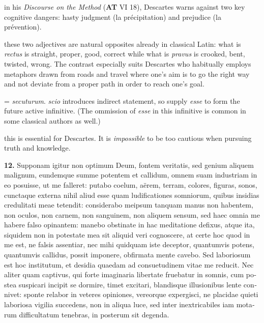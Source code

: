  in his \textit{Discourse on the Method} (\textbf{AT} VI 18), Descartes warns against two key cognitive dangers: hasty judgment (la précipitation) and prejudice (la prévention).

 these two adjectives are natural opposites already in classical Latin: what is \textit{rectus} is straight, proper, good, correct while what is \textit{pravus} is crooked, bent, twisted, wrong. The contrast especially suits Descartes who habitually employs metaphors drawn from roads and travel where one's aim is to go the right way and not deviate from a proper path in order to reach one's goal.

 = \textit{secuturum}. \textit{scio} introduces indirect statement, so supply \textit{esse} to form the future active infinitive. (The ommission of \textit{esse} in this infinitive is common in some classical authors as well.)

 this is essential for Descartes. It is \textit{impossible} to be too cautious when pursuing truth and knowledge.

\clearpage

\beginnumbering
\pstart
\begin{latin}
    \textenglish{\textbf{12.}} Supponam igitur non optimum Deum, fontem veritatis, sed genium aliquem malignum, eundemque summe potentem et callidum, omnem suam industriam in eo posuisse, ut me falleret: putabo coelum, aërem, terram, colores, figuras, sonos, cunctaque externa nihil aliud esse quam ludificationes somniorum, quibus insidias credulitati meae tetendit: considerabo meipsum tanquam manus non habentem, non oculos, non carnem, non sanguinem, non aliquem sensum, sed haec omnia me habere falso opinantem: manebo obstinate in hac meditatione defixus, atque ita, siquidem non in potestate mea sit aliquid veri cognoscere, at certe hoc quod in me est, ne falsis assentiar, nec mihi quidquam iste deceptor, quantumvis potens, quantumvis callidus, possit imponere, obfirmata mente cavebo. Sed laboriosum est hoc institutum, et desidia quaedam ad consuetudinem vitae me reducit. Nec aliter quam captivus, qui forte imaginaria libertate fruebatur in somnis, cum postea suspicari incipit se dormire, timet excitari, blandisque illusionibus lente connivet:  sponte relabor in veteres opiniones, vereorque expergisci, ne placidae quieti laboriosa vigilia succedens, non in aliqua luce, sed inter inextricabiles iam motarum difficultatum tenebras, in posterum sit degenda.
\end{latin}
\pend
\endnumbering


